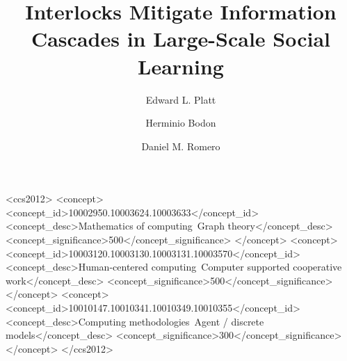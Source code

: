 \documentclass[manuscript,screen,review,acmsmall]{acmart}
\begin{document}
\title{Interlocks Mitigate Information Cascades in Large-Scale Social Learning}

\author{Edward L. Platt}

\author{Herminio Bodon}

\author{Daniel M. Romero}


\renewcommand{\shortauthors}{Platt, Bodon, \& Romero}

\begin{abstract}

\end{abstract}

\begin{CCSXML}
<ccs2012>
<concept>
<concept_id>10002950.10003624.10003633</concept_id>
<concept_desc>Mathematics of computing~Graph theory</concept_desc>
<concept_significance>500</concept_significance>
</concept>
<concept>
<concept_id>10003120.10003130.10003131.10003570</concept_id>
<concept_desc>Human-centered computing~Computer supported cooperative work</concept_desc>
<concept_significance>500</concept_significance>
</concept>
<concept>
<concept_id>10010147.10010341.10010349.10010355</concept_id>
<concept_desc>Computing methodologies~Agent / discrete models</concept_desc>
<concept_significance>300</concept_significance>
</concept>
</ccs2012>
\end{CCSXML}
\end{document}

